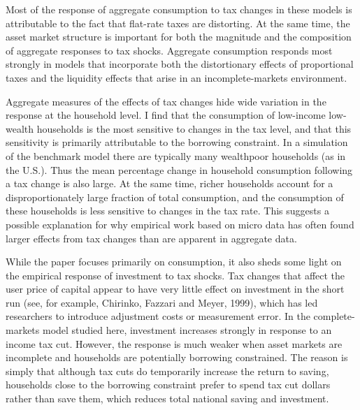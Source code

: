 \documentclass[11pt]{article}
\begin{document}
Most of the response of aggregate consumption to tax changes in these models is attributable to the fact that flat-rate taxes are distorting. At the same time, the asset market structure is important for both the magnitude and the composition of aggregate responses to tax shocks. Aggregate consumption responds most strongly in models that incorporate both the distortionary effects of proportional taxes and the liquidity effects that arise in an incomplete-markets environment.

Aggregate measures of the effects of tax changes hide wide variation in the response at the household level. I find that the consumption of low-income low-wealth households is the most sensitive to changes in the tax level, and that this sensitivity is primarily attributable to the borrowing constraint. In a simulation of the benchmark model there are typically many wealthpoor households (as in the U.S.). Thus the mean percentage change in household consumption following a tax change is also large. At the same time, richer households account for a disproportionately large fraction of total consumption, and the consumption of these households is less sensitive to changes in the tax rate. This suggests a possible explanation for why empirical work based on micro data has often found larger effects from tax changes than are apparent in aggregate data.

While the paper focuses primarily on consumption, it also sheds some light on the empirical response of investment to tax shocks. Tax changes that affect the user price of capital appear to have very little effect on investment in the short run (see, for example, Chirinko, Fazzari and Meyer, 1999), which has led researchers to introduce adjustment costs or measurement error. In the complete-markets model studied here, investment increases strongly in response to an income tax cut. However, the response is much weaker when asset markets are incomplete and households are potentially borrowing constrained. The reason is simply that although tax cuts do temporarily increase the return to saving, households close to the borrowing constraint prefer to spend tax cut dollars rather than save them, which reduces total national saving and investment.
\end{document}
